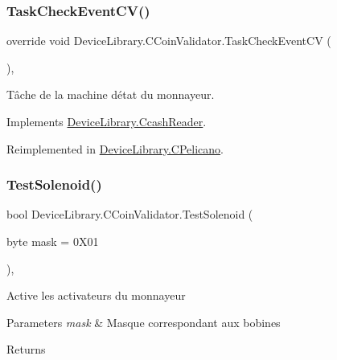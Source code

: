 \subsubsection{\texorpdfstring{Task\+Check\+Event\+C\+V()}{TaskCheckEventCV()}}
{\footnotesize\ttfamily override void Device\+Library.\+C\+Coin\+Validator.\+Task\+Check\+Event\+CV (\begin{DoxyParamCaption}{ }\end{DoxyParamCaption})\hspace{0.3cm}{\ttfamily [inline]}, {\ttfamily [virtual]}}



Tâche de la machine d\textquotesingle{}état du monnayeur. 



Implements \mbox{\hyperlink{class_device_library_1_1_ccash_reader_ab2ea8031995213b54aa9801f86f15315}{Device\+Library.\+Ccash\+Reader}}.



Reimplemented in \mbox{\hyperlink{class_device_library_1_1_c_pelicano_a38a0d7a675ff22773f5eb153fab9275a}{Device\+Library.\+C\+Pelicano}}.

\mbox{\label{class_device_library_1_1_c_coin_validator_aca5a7f6d4805b9cd2df7b4d4fbdd0686}} 
\subsubsection{\texorpdfstring{Test\+Solenoid()}{TestSolenoid()}}
{\footnotesize\ttfamily bool Device\+Library.\+C\+Coin\+Validator.\+Test\+Solenoid (\begin{DoxyParamCaption}\item[{byte}]{mask = {\ttfamily 0X01} }\end{DoxyParamCaption})\hspace{0.3cm}{\ttfamily [inline]}, {\ttfamily [protected]}}



Active les activateurs du monnayeur 


\begin{DoxyParams}{Parameters}
{\em mask} & Masque correspondant aux bobines\\
\hline
\end{DoxyParams}
\begin{DoxyReturn}{Returns}

\end{DoxyReturn}


